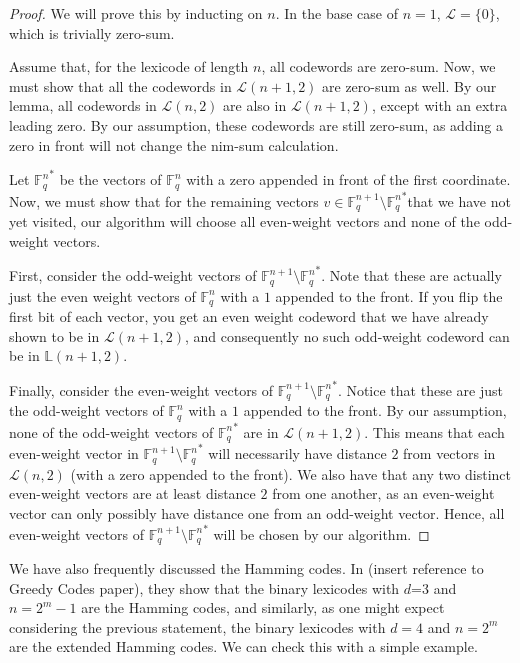 \documentclass{article}
\theoremstyle{plain}
\theoremstyle{definition}
\begin{document}
\begin{proof}
We will prove this by inducting on $n$.  In the base case of $n=1$,
$\mathcal{L}=\{0\}$, which is trivially zero-sum.  

Assume that, for the lexicode of length $n$, all codewords are zero-sum.  Now, we must show that all
the codewords in $\mathcal{L}(n+1,2)$ are zero-sum as well.  By our lemma, all codewords in $\mathcal{L}(n,2)$ are also in $\mathcal{L}(n+1,2)$, except with an
extra leading zero.  By our assumption, these codewords are still zero-sum, as adding a zero in front will not change the nim-sum calculation.

Let ${\mathbb{F}_q^n}^*$ be the vectors of $\mathbb{F}_q^n$ with a zero appended in front of the first coordinate.  Now, we must show that for the remaining vectors $v\in\mathbb{F}_q^{n+1} \setminus {\mathbb{F}_q^{n}}^*$that we have not yet visited, our algorithm will choose all
even-weight vectors and none of the odd-weight vectors.  

First, consider the odd-weight vectors of $\mathbb{F}_q^{n+1} \setminus {\mathbb{F}_q^{n}}^*$.  Note that 
these are actually just the even weight vectors of $\mathbb{F}_q^n$ with a $1$ appended to the front.  If you flip the first bit of each vector, you get an even weight codeword that
we have already shown to be in $\mathcal{L}(n+1,2)$, and consequently no such odd-weight codeword can be in $\mathbb{L}(n+1,2)$.

Finally, consider the even-weight vectors of $\mathbb{F}_q^{n+1} \setminus {\mathbb{F}_q^{n}}^*$.  Notice that these are just the odd-weight vectors of $\mathbb{F}_q^n$ with a $1$
appended to the front.  By our assumption, none of the odd-weight vectors of ${\mathbb{F}_q^n}^*$ are in $\mathcal{L}(n+1,2)$.  This means that each even-weight
vector in $\mathbb{F}_q^{n+1} \setminus {\mathbb{F}_q^{n}}^*$ will necessarily have distance $2$ from vectors in $\mathcal{L}(n,2)$ (with a zero appended to the front).  We also
have that any two distinct even-weight vectors are at least distance $2$ from one another, as an even-weight vector can only possibly have distance one from an odd-weight vector.  
Hence, all even-weight vectors of $\mathbb{F}_q^{n+1} \setminus {\mathbb{F}_q^{n}}^*$ will be chosen by our algorithm.
\end{proof}

We have also frequently discussed the Hamming codes.  In (insert reference to Greedy Codes paper), they show that the binary lexicodes with $d$=3 and $n=2^m-1$ are the Hamming codes, 
and similarly, as one might expect considering the previous statement, the binary lexicodes with $d=4$ and $n=2^m$ are the extended Hamming codes.  We can check
this with a simple example.
\end{document}
